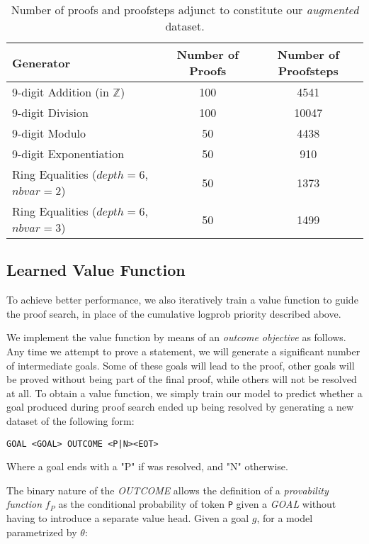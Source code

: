 \documentclass{article}
\begin{document}
\begin{table}[ht]
\caption{Number of proofs and proofsteps adjunct to constitute our \textit{augmented} dataset.}
\centering
\begin{tabular}{ |l|c|c| }
    \hline
    Generator & Number of Proofs & Number of Proofsteps \\
    \hline
    9-digit Addition (in $\mathbb{Z}$) & 100 & 4541 \\
    9-digit Division & 100 & 10047 \\
    9-digit Modulo & 50 & 4438 \\
    9-digit Exponentiation & 50 & 910 \\
    Ring Equalities ($\mathit{depth}=6$, $\mathit{nbvar}=2$) & 50 & 1373 \\
    Ring Equalities ($\mathit{depth}=6$, $\mathit{nbvar}=3$) & 50 & 1499 \\
    \hline
 \end{tabular}
\label{table:augmented}
\end{table}

\subsection{Learned Value Function}
\label{section:learnedvalue}

To achieve better performance, we also iteratively train a value function to guide the proof search, in place of the cumulative logprob priority described above.

We implement the value function by means of an \textit{outcome objective} as follows. Any time we attempt to prove a statement, we will generate a significant number of intermediate goals. Some of these goals will lead to the proof, other goals will be proved without being part of the final proof, while others will not be resolved at all. To obtain a value function, we simply train our model to predict whether a goal produced during proof search ended up being resolved by generating a new dataset of the following form:  

\begin{verbatim}
GOAL <GOAL> OUTCOME <P|N><EOT>
\end{verbatim}

Where a goal ends with a "P" if was resolved, and "N" otherwise.

The binary nature of the \textit{OUTCOME} allows the definition of a \textit{provability function} $f_P$ as the conditional probability of token \verb|P| given a \textit{GOAL} without having to introduce a separate value head. Given a goal $g$, for a model parametrized by $\theta$:
\end{document}
